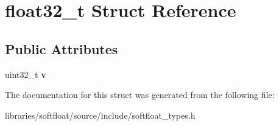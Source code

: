 \hypertarget{structfloat32__t}{}\section{float32\+\_\+t Struct Reference}
\label{structfloat32__t}
\subsection*{Public Attributes}
\begin{DoxyCompactItemize}
\item 
\mbox{\label{structfloat32__t_a2f545fc2325b5e603191faca9ebde4b0}} 
uint32\+\_\+t {\bfseries v}
\end{DoxyCompactItemize}


The documentation for this struct was generated from the following file\+:\begin{DoxyCompactItemize}
\item 
libraries/softfloat/source/include/softfloat\+\_\+types.\+h\end{DoxyCompactItemize}
